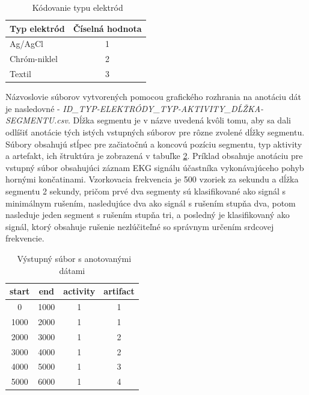 \begin{table}[H]\centering
\caption[Kódovanie typu elektród]{~Kódovanie typu elektród}\label{tab:labels_electrode}
    \begin{tabular}{l|c}
    	\textbf{Typ elektród}  & \textbf{Číselná hodnota}     \tabularnewline \hline 
     	Ag/AgCl                & 1	                          \tabularnewline \hline
     	Chróm-niklel	       & 2	                          \tabularnewline \hline
        Textil	               & 3	                          \tabularnewline
    \end{tabular}
\end{table}

Názvoslovie súborov vytvorených pomocou grafického rozhrania na anotáciu dát je nasledovné - \textit{ID\_TYP-ELEKTRÓDY\_TYP-AKTIVITY\_DĹŽKA-SEGMENTU.csv}. Dĺžka segmentu je v názve uvedená kvôli tomu, aby sa dali odlíšiť anotácie tých istých vstupných súborov pre rôzne zvolené dĺžky segmentu. Súbory obsahujú stĺpec pre začiatočnú a koncovú pozíciu segmentu, typ aktivity a artefakt, ich štruktúra je zobrazená v tabuľke \ref{tab:output}. Príklad obsahuje anotáciu pre vstupný súbor obsahujúci záznam EKG signálu účastníka vykonávajúceho pohyb hornými končatinami. Vzorkovacia frekvencia je 500 vzoriek za sekundu a dĺžka segmentu 2 sekundy, pričom prvé dva segmenty sú klasifikované ako signál s minimálnym rušením, nasledujúce dva ako signál s rušením stupňa dva, potom nasleduje jeden segment s rušením stupňa tri, a posledný je klasifikovaný ako signál, ktorý obsahuje rušenie nezlúčiteľné so správnym určením srdcovej frekvencie.

\begin{table}[H]\centering
\caption[Výstupný súbor s anotovanými dátami]{~Výstupný súbor s anotovanými dátami}\label{tab:output}
    \begin{tabular}{c|c|c|c}
    	\textbf{start} & \textbf{end} & \textbf{activity} & \textbf{artifact}  \tabularnewline \hline 
     	0		       & 1000		  & 1	              & 1	               \tabularnewline \hline
     	1000	       & 2000	      & 1	              & 1	               \tabularnewline \hline
        2000	       & 3000	      & 1	              & 2	               \tabularnewline \hline
        3000	       & 4000	      & 1	              & 2	               \tabularnewline
        \hline
        4000	       & 5000	      & 1	              & 3	               \tabularnewline \hline
        5000	       & 6000	      & 1	              & 4	               \tabularnewline
    \end{tabular}
\end{table}

